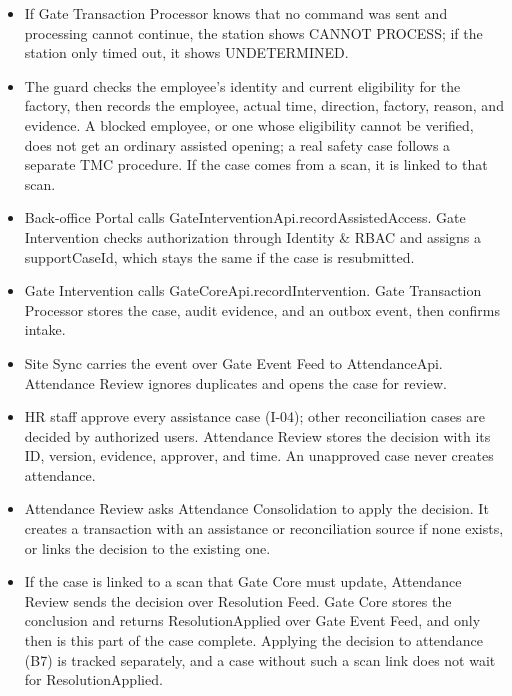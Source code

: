 \begin{itemize}[leftmargin=30pt, labelwidth=24pt, labelsep=6pt, align=left, itemsep=3pt, topsep=4pt, parsep=2pt]
  \item[\textbf{B1}] If Gate Transaction Processor knows that no command was sent and processing cannot continue, the station shows CANNOT PROCESS; if the station only timed out, it shows UNDETERMINED.
  \item[\textbf{B2}] The guard checks the employee's identity and current eligibility for the factory, then records the employee, actual time, direction, factory, reason, and evidence. A blocked employee, or one whose eligibility cannot be verified, does not get an ordinary assisted opening; a real safety case follows a separate TMC procedure. If the case comes from a scan, it is linked to that scan.
  \item[\textbf{B3}] Back-office Portal calls GateInterventionApi.recordAssistedAccess. Gate Intervention checks authorization through Identity \& RBAC and assigns a supportCaseId, which stays the same if the case is resubmitted.
  \item[\textbf{B4}] Gate Intervention calls GateCoreApi.recordIntervention. Gate Transaction Processor stores the case, audit evidence, and an outbox event, then confirms intake.
  \item[\textbf{B5}] Site Sync carries the event over Gate Event Feed to AttendanceApi. Attendance Review ignores duplicates and opens the case for review.
  \item[\textbf{B6}] HR staff approve every assistance case (I-04); other reconciliation cases are decided by authorized users. Attendance Review stores the decision with its ID, version, evidence, approver, and time. An unapproved case never creates attendance.
  \item[\textbf{B7}] Attendance Review asks Attendance Consolidation to apply the decision. It creates a transaction with an assistance or reconciliation source if none exists, or links the decision to the existing one.
  \item[\textbf{B8}] If the case is linked to a scan that Gate Core must update, Attendance Review sends the decision over Resolution Feed. Gate Core stores the conclusion and returns ResolutionApplied over Gate Event Feed, and only then is this part of the case complete. Applying the decision to attendance (B7) is tracked separately, and a case without such a scan link does not wait for ResolutionApplied.
\end{itemize}

